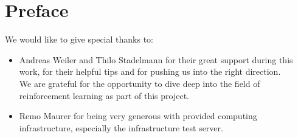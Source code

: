 \chapter*{Preface}\label{preface}
We would like to give special thanks to:
\begin{itemize}
    \item Andreas Weiler and Thilo Stadelmann for their great support during this work, for their helpful tips and for pushing us into the right direction.\\
    We are grateful for the opportunity to dive deep into the field of reinforcement learning as part of this project.
    \item Remo Maurer for being very generous with provided computing infrastructure, especially the infrastructure test server.
\end{itemize}

